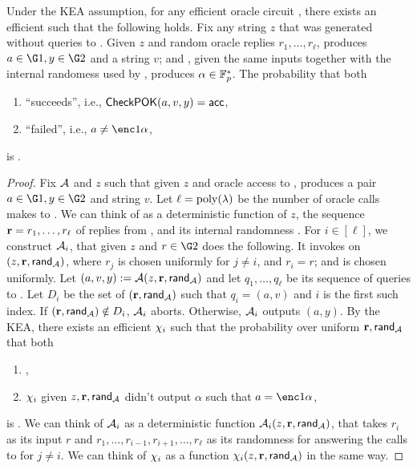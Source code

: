 \documentclass{article}
\begin{document}
\begin{claim}\label{clm:KEA}
Under the KEA assumption, for any efficient oracle circuit \adv, there exists an efficient \ext such that the following holds.
Fix any string $z$ that was generated without queries to \RO.
Given $z$ and random oracle replies $r_1,\ldots,r_\ell$, \adv produces $a\in \G1,y\in \G2$ and a string $v$; and \ext, given the same inputs together with the internal randomess used by \adv, produces $\alpha\in {\mathbb F}_p^*$.
The probability that both  
 \begin{enumerate}
  \item \adv ``succeeds'', i.e., $\mathsf{CheckPOK}(a,v,y)=\mathsf{acc}$, 
  \item \ext ``failed'', i.e., $a\neq \enc1{\alpha}$,
   \end{enumerate}
is \negl.
\begin{proof}
 Fix $\mathcal{A}$ and $z$ such that given $z$ and oracle access to \RO, \adv produces a pair $a\in \G1,y\in \G2$ and string $v$.
 Let $\ell=\rm{poly(\lambda})$ be the number of oracle calls \adv makes to \RO.
 We can think of \adv as a deterministic function of $z$, the sequence $\textbf{r}=r_1,\ldots,r_\ell$ of replies from \RO, and its internal randomness \advrand.
 For $i\in [\ell]$, we construct $\mathcal{A}_i$, that given $z$ and $r\in \G2$ does the following.
 It invokes \adv on $(z,\textbf{r},\mathsf{rand_{\mathcal{A}}})$, where $r_j$ is chosen uniformly for $j\neq i$,
and $r_i=r$; and \advrand is chosen uniformly.
Let $(a,v,y):= \mathcal{A}(z,\textbf{r},\mathsf{rand_{\mathcal{A}}})$ and let $q_1,\ldots,q_\ell$ be its sequence of queries to \RO.
Let $D_i$ be the set of $(\textbf{r},\mathsf{rand_{\mathcal{A}}})$ such that $q_i=(a,v)$ and $i$ is the first such index.
If $(\textbf{r},\mathsf{rand_{\mathcal{A}}})\notin D_i$,
$\mathcal{A}_i$ aborts.
Otherwise, $\mathcal{A}_i$ outputs $(a,y)$.
By the KEA, there exists an efficient $\chi_i$ such that
the probability over uniform $\textbf{r},\mathsf{rand_{\mathcal{A}}}$ that both
 \begin{enumerate}
  \item {},
  \item $\chi_i$ given $z,\textbf{r},\mathsf{rand_{\mathcal{A}}}$ didn't output $\alpha$ such that $a=\enc1{\alpha}$,
 \end{enumerate}
 is \negl.
 We can think of $\mathcal{A}_i$ as a deterministic function $\mathcal{A}_i(z,\textbf{r},\mathsf{rand_{\mathcal{A}}})$,
 that takes $r_i$ as its input $r$ and $r_1,\ldots,r_{i-1},r_{i+1},\ldots,r_\ell$ as its randomness for answering the calls to \RO for $j\neq i$.
 We can think of $\chi_i$ as a function $\chi_i(z,\textbf{r},\mathsf{rand_{\mathcal{A}}})$ in the same way.
 

\end{proof}
\end{claim}
\end{document}
